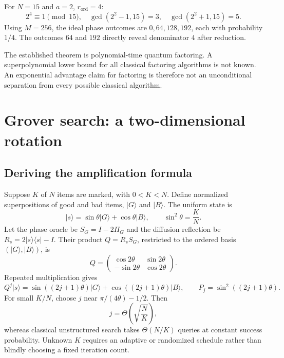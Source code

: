 \documentclass[11pt,a4paper]{article}
\newcommand{\ket}[1]{\lvert #1\rangle}
\newcommand{\bra}[1]{\langle #1\rvert}
\newcommand{\rord}{r_{\mathrm{ord}}}
\DeclareMathOperator{\gcdop}{gcd}
\theoremstyle{definition}
\theoremstyle{remark}
\numberwithin{equation}{section}
\begin{document}
For $N=15$ and $a=2$, ${\rord}=4$:
\begin{equation}
 2^4\equiv1\pmod{15},\quad
 \gcdop(2^2-1,15)=3,\quad \gcdop(2^2+1,15)=5.
\end{equation}
Using $M=256$, the ideal phase outcomes are $0,64,128,192$, each with
probability $1/4$. The outcomes $64$ and $192$ directly reveal denominator
$4$ after reduction.

The established theorem is polynomial-time quantum factoring. A
superpolynomial lower bound for all classical factoring algorithms is not
known. An exponential advantage claim for factoring is therefore not an
unconditional separation from every possible classical algorithm.

\section{Grover search: a two-dimensional rotation}\label{sec:grover}
\subsection{Deriving the amplification formula}
Suppose $K$ of $N$ items are marked, with $0<K<N$. Define normalized
superpositions of good and bad items, $\ket{G}$ and $\ket{B}$. The uniform state
is
\begin{equation}
 \ket{s}=\sin\theta\ket{G}+\cos\theta\ket{B},\qquad \sin^2\theta=\frac KN.
\end{equation}
Let the phase oracle be $S_G=I-2\Pi_G$ and the diffusion reflection be
$R_s=2\ket{s}\bra{s}-I$. Their product $Q=R_sS_G$, restricted to the ordered basis
$(\ket{G},\ket{B})$, is
\begin{equation}
 Q=\begin{pmatrix}\cos2\theta&\sin2\theta\\-\sin2\theta&\cos2\theta\end{pmatrix}.
\end{equation}
Repeated multiplication gives
\begin{equation}\label{eq:grover}
 Q^j\ket{s}=
 \sin((2j+1)\theta)\ket{G}+\cos((2j+1)\theta)\ket{B},\qquad
 P_j=\sin^2((2j+1)\theta).
\end{equation}
For small $K/N$, choose $j$ near $\pi/(4\theta)-1/2$. Then
\begin{equation}
 j=\Theta\!\left(\sqrt{\frac NK}\right),
\end{equation}
whereas classical unstructured search takes $\Theta(N/K)$ queries at
constant success probability. Unknown $K$ requires an adaptive or randomized
schedule rather than blindly choosing a fixed iteration count.
\end{document}
